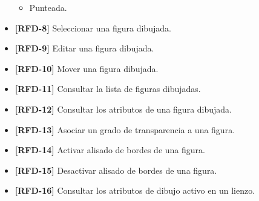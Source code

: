 \begin{itemize}
\begin{itemize}
\item{Punteada.}
\end{itemize}
\item{\textbf{[RFD-8]} Seleccionar una figura dibujada.}
\item{\textbf{[RFD-9]} Editar una figura dibujada.}
\item{\textbf{[RFD-10]} Mover una figura dibujada.}
\item{\textbf{[RFD-11]} Consultar la lista de figuras dibujadas.}
\item{\textbf{[RFD-12]} Consultar los atributos de una figura dibujada.}
\item{\textbf{[RFD-13]} Asociar un grado de transparencia a una figura.}
\item{\textbf{[RFD-14]} Activar alisado de bordes de una figura.}
\item{\textbf{[RFD-15]} Desactivar alisado de bordes de una figura.}
\item{\textbf{[RFD-16]} Consultar los atributos de dibujo activo en un lienzo.}
\end{itemize}
